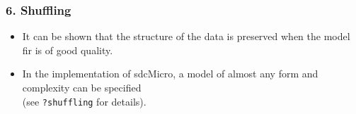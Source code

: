 \documentclass{beamer}
\begin{document}
\begin{frame}
	\frametitle{6. Shuffling}
	\begin{itemize}
		\item It can be shown that the structure of the data is preserved when the model fir
		is of good quality. \item In the implementation of sdcMicro, a model of almost any form
		and complexity can be specified 
		\\ (see \texttt{?shuffling} for details).
	\end{itemize}
\end{frame}
\end{document}
